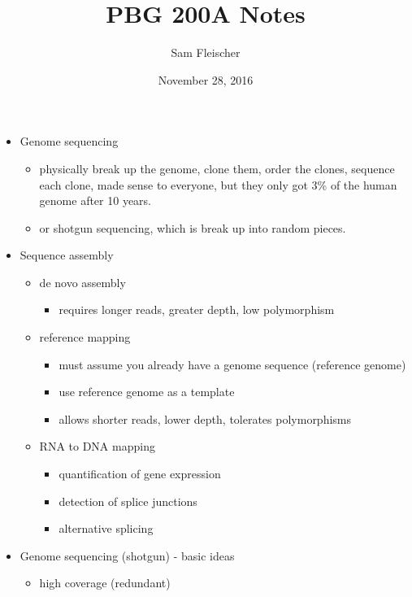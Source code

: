 \documentclass{article}
\title{PBG 200A Notes}
\author{Sam Fleischer}
\date{November 28, 2016}
\begin{document}
    \maketitle

    \begin{itemize}
        \item Genome sequencing
        \begin{itemize}
            \item physically break up the genome, clone them, order the clones, sequence each clone, made sense to everyone, but they only got 3\% of the human genome after 10 years.
            \item or shotgun sequencing, which is break up into random pieces.
        \end{itemize}
        \item Sequence assembly
        \begin{itemize}
            \item de novo assembly
            \begin{itemize}
                \item requires longer reads, greater depth, low polymorphism
            \end{itemize}
            \item reference mapping
            \begin{itemize}
                \item must assume you already have a genome sequence (reference genome)
                \item use reference genome as a template
                \item allows shorter reads, lower depth, tolerates polymorphisms
            \end{itemize}
            \item RNA to DNA mapping
            \begin{itemize}
                \item quantification of gene expression
                \item detection of splice junctions
                \item alternative splicing
            \end{itemize}
        \end{itemize}
        \item Genome sequencing (shotgun) - basic ideas
        \begin{itemize}
            \item high coverage (redundant)

\end{itemize}
\end{itemize}
\end{document}
